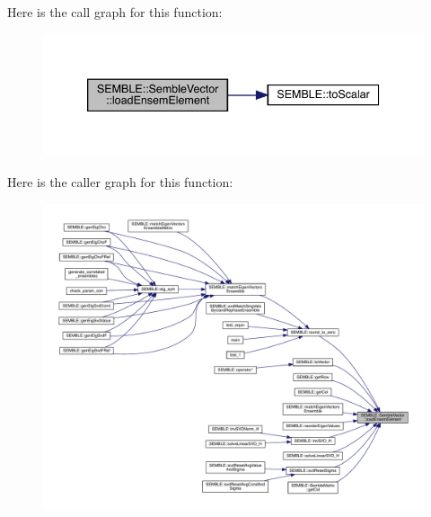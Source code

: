 Here is the call graph for this function\+:
\nopagebreak
\begin{figure}[H]
\begin{center}
\leavevmode
\includegraphics[width=339pt]{d9/d94/structSEMBLE_1_1SembleVector_acac507fe462d0c438a429128dfbf0eb1_cgraph}
\end{center}
\end{figure}
Here is the caller graph for this function\+:
\nopagebreak
\begin{figure}[H]
\begin{center}
\leavevmode
\includegraphics[width=350pt]{d9/d94/structSEMBLE_1_1SembleVector_acac507fe462d0c438a429128dfbf0eb1_icgraph}
\end{center}
\end{figure}
\mbox{\label{structSEMBLE_1_1SembleVector_acac507fe462d0c438a429128dfbf0eb1}} 

